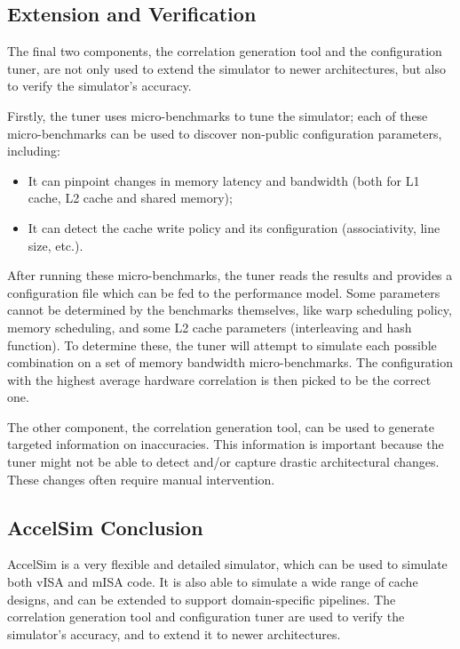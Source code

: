 \subsection{Extension and Verification}\label{subsec:extension-and-verification}
The final two components, the correlation generation tool and the configuration tuner, are not only used to extend the simulator to newer architectures, but also to verify the simulator's accuracy.

Firstly, the tuner uses micro-benchmarks to tune the simulator; each of these micro-benchmarks can be used to discover non-public configuration parameters, including:
\begin{itemize}
    \item It can pinpoint changes in memory latency and bandwidth (both for L1 cache, L2 cache and shared memory);
    \item It can detect the cache write policy and its configuration (associativity, line size, etc.).
\end{itemize}

After running these micro-benchmarks, the tuner reads the results and provides a configuration file which can be fed to the performance model.
Some parameters cannot be determined by the benchmarks themselves, like warp scheduling policy, memory scheduling, and some L2 cache parameters (interleaving and hash function).
To determine these, the tuner will attempt to simulate each possible combination on a set of memory bandwidth micro-benchmarks.
The configuration with the highest average hardware correlation is then picked to be the correct one.

\vspace{5mm}

The other component, the correlation generation tool, can be used to generate targeted information on inaccuracies.
This information is important because the tuner might not be able to detect and/or capture drastic architectural changes.
These changes often require manual intervention.

\subsection{AccelSim Conclusion}\label{subsec:accelsim-conclusion}
AccelSim is a very flexible and detailed simulator, which can be used to simulate both vISA and mISA code.
It is also able to simulate a wide range of cache designs, and can be extended to support domain-specific pipelines.
The correlation generation tool and configuration tuner are used to verify the simulator's accuracy, and to extend it to newer architectures.

